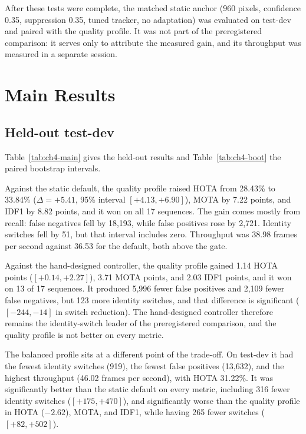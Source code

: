 After these tests were complete, the matched static anchor (960 pixels, confidence 0.35, suppression 0.35, tuned tracker, no adaptation) was evaluated on test-dev and paired with the quality profile. It was not part of the preregistered comparison: it serves only to attribute the measured gain, and its throughput was measured in a separate session.

\section{Main Results}\label{sec:ch4-results}

\subsection{Held-out test-dev}
Table~\ref{tab:ch4-main} gives the held-out results and Table~\ref{tab:ch4-boot} the paired bootstrap intervals.





Against the static default, the quality profile raised HOTA from 28.43\% to 33.84\% ($\Delta=+5.41$, 95\% interval $[+4.13, +6.90]$), MOTA by 7.22 points, and IDF1 by 8.82 points, and it won on all 17 sequences. The gain comes mostly from recall: false negatives fell by 18,193, while false positives rose by 2,721. Identity switches fell by 51, but that interval includes zero. Throughput was 38.98 frames per second against 36.53 for the default, both above the gate.

Against the hand-designed controller, the quality profile gained 1.14 HOTA points ($[+0.14, +2.27]$), 3.71 MOTA points, and 2.03 IDF1 points, and it won on 13 of 17 sequences. It produced 5,996 fewer false positives and 2,109 fewer false negatives, but 123 more identity switches, and that difference is significant ($[-244, -14]$ in switch reduction). The hand-designed controller therefore remains the identity-switch leader of the preregistered comparison, and the quality profile is not better on every metric.

The balanced profile sits at a different point of the trade-off. On test-dev it had the fewest identity switches (919), the fewest false positives (13,632), and the highest throughput (46.02 frames per second), with HOTA 31.22\%. It was significantly better than the static default on every metric, including 316 fewer identity switches ($[+175, +470]$), and significantly worse than the quality profile in HOTA ($-2.62$), MOTA, and IDF1, while having 265 fewer switches ($[+82, +502]$).


